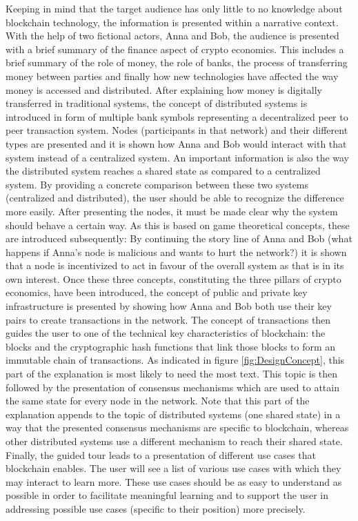 Keeping in mind that the target audience has only little to no knowledge about blockchain technology, the information is presented within a narrative context. With the help of two fictional actors, Anna and Bob, the audience is presented with a brief summary of the finance aspect of crypto economics. This includes a brief summary of the role of money, the role of banks, the process of transferring money between parties and finally how new technologies have affected the way money is accessed and distributed. After explaining how money is digitally transferred in traditional systems, the concept of distributed systems is introduced in form of multiple bank symbols representing a decentralized peer to peer transaction system. Nodes (participants in that network) and their different types are presented and it is shown how Anna and Bob would interact with that system instead of a centralized system. An important information is also the way the distributed system reaches a shared state as compared to a centralized system. By providing a concrete comparison between these two systems (centralized and distributed), the user should be able to recognize the difference more easily. After presenting the nodes, it must be made clear why the system should behave a certain way. As this is based on game theoretical concepts, these are introduced subsequently: By continuing the story line of Anna and Bob (what happens if Anna's node is malicious and wants to hurt the network?) it is shown that a node is incentivized to act in favour of the overall system as that is in its own interest. Once these three concepts, constituting the three pillars of crypto economics, have been introduced, the concept of public and private key infrastructure is presented by showing how Anna and Bob both use their key pairs to create transactions in the network. The concept of transactions then guides the user to one of the technical key characteristics of blockchain: the blocks and the cryptographic hash functions that link those blocks to form an immutable chain of transactions. As indicated in figure \ref{fig:DesignConcept}, this part of the explanation is most likely to need the most text. This topic is then followed by the presentation of consensus mechanisms which are used to attain the same state for every node in the network. Note that this part of the explanation appends to the topic of distributed systems (one shared state) in a way that the presented consensus mechanisms are specific to blockchain, whereas other distributed systems use a different mechanism to reach their shared state. Finally, the guided tour leads to a presentation of different use cases that blockchain enables. The user will see a list of various use cases with which they may interact to learn more. These use cases should be as easy to understand as possible in order to facilitate meaningful learning and to support the user in addressing possible use cases (specific to their position) more precisely.


